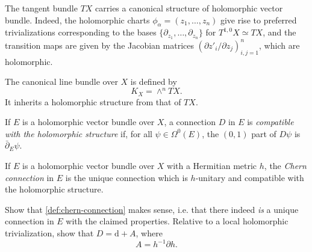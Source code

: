 \documentclass[12pt,letterpaper,reqno]{article}
\numberwithin{equation}{section}
\newcommand{\C}{\ensuremath{\mathbb C}}
\newcommand{\de}{\mathrm{d}}
\newcommand{\ti}[1]{\textit{#1}}
\begin{document}
\begin{example} The tangent bundle $TX$ carries
a canonical structure of holomorphic vector bundle.
Indeed, the holomorphic charts $\phi_\alpha = (z_1, \dots, z_n)$ 
give rise to preferred trivializations corresponding 
to the bases $\{\partial_{z_1}, \dots, \partial_{z_n} \}$
for $T^{1,0} X \simeq TX$, and the transition 
maps are given by the Jacobian matrices 
$(\partial z'_i / \partial z_j)_{i,j=1}^n$, which are holomorphic.
\end{example}

\begin{example} The canonical line bundle over $X$ 
is defined by
\begin{equation}
  K_X = \wedge^n TX.
\end{equation}
It inherits a holomorphic structure from that of $TX$.
\end{example} 

\begin{defn}
If $E$ is a holomorphic vector bundle over $X$,
a connection $D$ in $E$ is \ti{compatible with the
holomorphic structure} if, for all 
$\psi \in \Omega^0(E)$, the $(0,1)$ part of $D \psi$ 
is $\bar\partial_E \psi$.
\end{defn}

\begin{defn} \label{def:chern-connection}
If $E$ is a holomorphic vector bundle over $X$ with
a Hermitian metric $h$, the \ti{Chern connection} 
in $E$ is the unique connection which is 
$h$-unitary and compatible with the holomorphic
structure.
\end{defn}

\begin{exercise} Show that \autoref{def:chern-connection} makes
sense, i.e. that there indeed \ti{is} a unique
connection in $E$ with the claimed properties.
Relative to a local holomorphic trivialization, show 
that $D = \de + A$,
where
\begin{equation} \label{eq:chern-connection-local-holomorphic}
  A = h^{-1} \partial h.
\end{equation}

\end{exercise}
\end{document}
